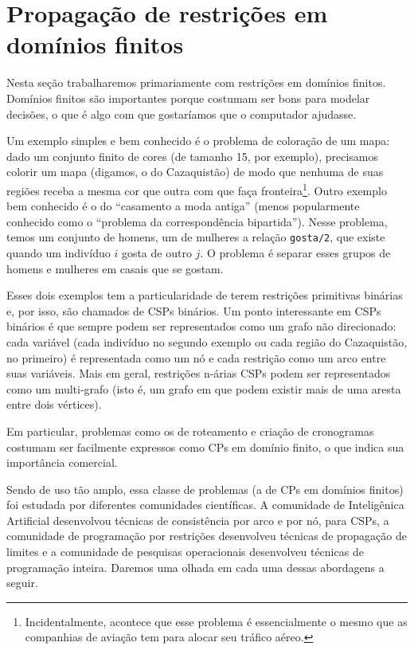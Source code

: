 \documentclass{article}
\begin{document}
\section{Propagação de restrições em domínios finitos}

Nesta seção trabalharemos primariamente com restrições em domínios finitos.
Domínios finitos são importantes porque costumam ser bons para modelar
decisões, o que é algo com que gostaríamos que o computador ajudasse.

Um exemplo simples e bem conhecido é o problema de coloração de um mapa: dado um conjunto finito de cores (de tamanho 15, por exemplo), precisamos colorir um mapa (digamos, o do Cazaquistão) de modo que nenhuma de suas regiões receba a mesma cor que outra com que faça fronteira\footnote{Incidentalmente, acontece que esse problema é essencialmente o mesmo que as companhias de aviação tem para alocar seu tráfico aéreo.}.
Outro exemplo bem conhecido é o do ``casamento a moda antiga'' (menos popularmente conhecido como o ``problema da correspondência bipartida'').
Nesse problema, temos um conjunto de homens, um de mulheres a relação {\tt gosta/2}, que existe quando um indivíduo $i$ gosta de outro $j$.
O problema é separar esses grupos de homens e mulheres em casais que se gostam.

Esses dois exemplos tem a particularidade de terem restrições primitivas binárias e, por isso, são chamados de CSPs binários. Um ponto interessante em CSPs binários é que sempre podem ser representados como um grafo não direcionado:
  cada variável (cada indivíduo no segundo exemplo ou cada região do Cazaquistão, no primeiro) é representada como um nó e cada restrição como um arco entre suas variáveis. Mais em geral, restrições n-árias CSPs podem ser representados como um multi-grafo (isto é, um grafo em que podem existir mais de uma aresta entre dois vértices).

  Em particular, problemas como os de roteamento e criação de cronogramas
  costumam ser facilmente expressos como CPs em domínio finito, o que indica sua importância comercial.

  Sendo de uso tão amplo, essa classe de problemas (a de CPs em domínios finitos) foi estudada por diferentes comunidades
científicas. A comunidade de Inteligênica Artificial desenvolvou técnicas de consistência por arco e por nó, para CSPs, a
comunidade de programação por restrições desenvolveu técnicas de propagação de limites e a comunidade de pesquisas
operacionais desenvolveu técnicas de programação inteira. Daremos uma olhada em cada uma dessas abordagens a seguir.
\end{document}
